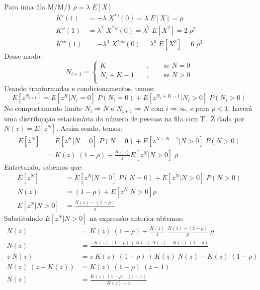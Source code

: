 \documentclass[a4paper]{article}
\newcommand{\E}[1]{E\!\left[#1\right]}
\begin{document}
Para uma fila M/M/1 \(\rho = \lambda \; \E{X}\)
\begin{align*}
    K'(1) &= -\lambda \; {X^*}'(0) = \lambda \; \E{X}
        = \rho \\
    K''(1) &= \lambda^2 \; {X^*}''(0)
        = \lambda^2 \; \E{X^2} = 2 \; \rho^2 \\
    K'''(1) &= - \lambda^3 \; {X^*}'''(0)
        = \lambda^3 \; \E{X^3} = 6 \; \rho^3
\end{align*}
Desse modo:
\[
    N_{i+1} = \begin{cases}
        K           \quad&, \qquad\text{se } N = 0 \\
        N_i + K - 1 \quad&, \qquad\text{se } N > 0 \\
    \end{cases}
\]
Usando tranformadas e condicionamentos, temos:
\[
    \E{z^{N_{i+1}}}
        = \E{z^{K} | N_i = 0} \; P(N_i = 0)
        + \E{z^{N_{i}+K-1} | N_i > 0} \; P(N_i > 0)
\]
No comportamento limite
\(N_i \Rightarrow N\) e \(N_{i+1} \Rightarrow N\)
com \(i \Rightarrow \infty\),
e para \(\rho < 1 \),
haverá uma distribuição estacionária
do número de pessoas na fila com T.~Z dada por
\(N(z) = \E{z^N}\).
Assim sendo, temos:
\begin{align*}
    \E{z^N} &= \E{z^K | N = 0} \; P(N = 0)
        + \E{z^{N+K-1} | N>0} \; P(N > 0) \\
    &= K(z) \; (1 - \rho)
        + \frac{K(z)}{z} \E{z^N | N > 0} \; \rho
\end{align*}
Entretando, sabemos que:
\begin{align*}
    \E{z^N} &= \E{z^N| N = 0} \; P(N = 0)
        + \E{z^N  | N > 0} \; P(N > 0) \\
    N(z) &= (1 - \rho) + \E{z^N | N > 0} \rho \\
    \E{z^N | N > 0} &= \frac{N(z) - (1 - \rho)}{\rho}
\end{align*}
Substituindo \(\E{z^N | N > 0}\)
na expressão anterior obtemos:
\begin{align*}
    N(z) &= K(z) \; (1 - \rho)
        + \frac{K(z)}{z} \; \frac{N(z) - (1 - \rho)}{\rho}
        \; \rho \\
    N(z) &= \frac{z \; K(z) \; (1 - \rho)
        + K(z) \; N(z) - K(z) \; (1 - \rho)}{z} \\
    z \; N(z) &= z \; K(z) \; (1 - \rho)
        + K(z) \; N(z) - K(z) \; (1 - \rho) \\
    N(z) \; (z - K(z)) &= K(z) \; (1 - \rho) \; (z - 1) \\
    N(z) &= \frac{K(z) \; (1 - \rho) \; (1 - z)}{K(z) - z}
\end{align*}
\end{document}
